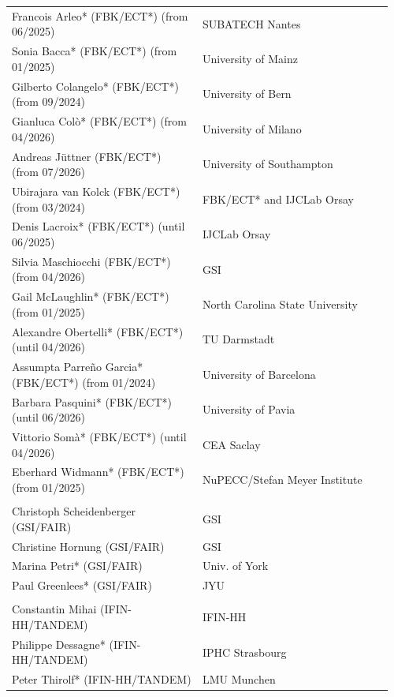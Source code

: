 \begin{longtable}{|L{0.48\linewidth}|C{0.48\linewidth}|}
      \\ \hline

   Francois Arleo* (FBK/ECT*) (from 06/2025) & SUBATECH Nantes \\ 
   \hline
   Sonia Bacca* (FBK/ECT*)  (from 01/2025) &  University of Mainz \\ \hline
Gilberto Colangelo* (FBK/ECT*) (from 09/2024) & University of Bern\\ \hline
Gianluca Col\`o* (FBK/ECT*) (from 04/2026) & University of Milano \\ \hline
Andreas J\"uttner (FBK/ECT*) (from 07/2026) & University of Southampton \\ \hline
Ubirajara van Kolck (FBK/ECT*)  (from 03/2024)  & FBK/ECT* and IJCLab Orsay \\ \hline   
Denis Lacroix* (FBK/ECT*) (until 06/2025) & IJCLab Orsay \\ \hline
Silvia Maschiocchi (FBK/ECT*) (from 04/2026) & GSI \\ \hline
Gail McLaughlin* (FBK/ECT*)  (from 01/2025) & North Carolina State University \\ \hline
Alexandre Obertelli* (FBK/ECT*) (until 04/2026)  & TU Darmstadt \\ \hline
Assumpta Parre\~no Garcia* (FBK/ECT*) (from 01/2024) & University of Barcelona \\ \hline
Barbara Pasquini* (FBK/ECT*) (until 06/2026)  & University of Pavia \\ \hline
Vittorio Somà* (FBK/ECT*) (until 04/2026)  & CEA Saclay \\ \hline
Eberhard Widmann* (FBK/ECT*) (from 01/2025) & NuPECC/Stefan Meyer Institute\\ \hline


      \\ \hline
    Christoph Scheidenberger (GSI/FAIR)	& GSI \\ \hline
    Christine Hornung (GSI/FAIR)	& GSI \\ \hline
    Marina Petri* (GSI/FAIR)	& Univ. of York \\ \hline
    Paul Greenlees* (GSI/FAIR)	& JYU \\ \hline

      \\ \hline
    Constantin Mihai (IFIN-HH/TANDEM)	& IFIN-HH \\ \hline
    Philippe Dessagne*  (IFIN-HH/TANDEM)	& IPHC Strasbourg \\ \hline
    Peter Thirolf*  (IFIN-HH/TANDEM)	& LMU Munchen \\ \hline


\end{longtable}
